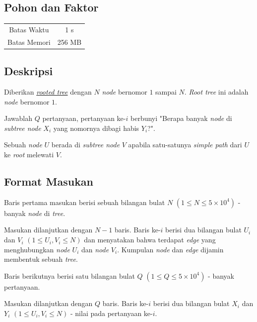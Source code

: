 \documentclass{article}
\begin{document}
\begin{center}
    \section*{Pohon dan Faktor} %

    \begin{tabular}{ | c c | }
        \hline
        Batas Waktu  & 1 s \\    %
        Batas Memori & 256 MB \\  %
        \hline
    \end{tabular}
\end{center}

\subsection*{Deskripsi}
Diberikan \href{https://en.wikipedia.org/wiki/Tree_(graph_theory)#Rooted_tree}{\textit{rooted tree}} dengan $N$ \textit{node} bernomor $1$ sampai $N$. \textit{Root tree} ini adalah \textit{node} bernomor $1$. 

Jawablah $Q$ pertanyaan, pertanyaan ke-$i$ berbunyi "Berapa banyak \textit{node} di \textit{subtree node} $X_i$ yang nomornya dibagi habis $Y_i$?".

Sebuah \textit{node} $U$ berada di \textit{subtree node} $V$ apabila satu-satunya \textit{simple path} dari $U$ ke \textit{root} melewati $V$.

\subsection*{Format Masukan}
Baris pertama masukan berisi sebuah bilangan bulat $N$ $(1 \leq N \leq 5 \times 10^4)$ - banyak \textit{node} di \textit{tree}.

Masukan dilanjutkan dengan $N-1$ baris. Baris ke-$i$ berisi dua bilangan bulat $U_i$ dan $V_i$ $(1 \leq U_i, V_i \leq N)$ dan menyatakan bahwa terdapat \textit{edge} yang menghubungkan \textit{node} $U_i$ dan \textit{node} $V_i$. Kumpulan \textit{node} dan \textit{edge} dijamin membentuk sebuah \textit{tree}.

Baris berikutnya berisi satu bilangan bulat $Q$ $(1 \leq Q \leq 5 \times 10^4)$ - banyak pertanyaan.

Masukan dilanjutkan dengan $Q$ baris. Baris ke-$i$ berisi dua bilangan bulat $X_i$ dan $Y_i$ $(1 \leq U_i, V_i \leq N)$ - nilai pada pertanyaan ke-$i$.
\end{document}
